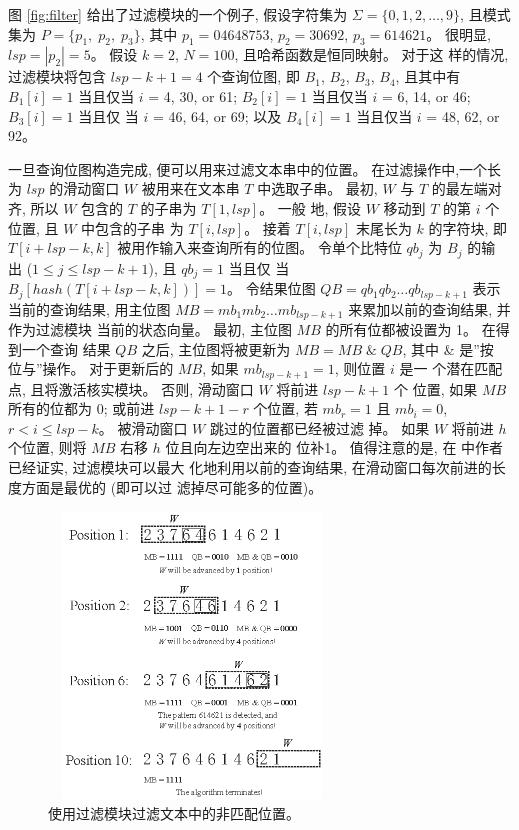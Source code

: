 图 \ref{fig:filter} 给出了过滤模块的一个例子, 假设字符集为
$\Sigma = \{0, 1, 2, \dots, 9\}$, 且模式集为 $P = \{p_1,\; p_2,\;
p_3\}$, 其中 $p_1 = 04648753$, $p_2 = 30692$, $p_3 = 614621$。 很明显,
$lsp = |p_2|= 5$。 假设 $k = 2$, $N = 100$, 且哈希函数是恒同映射。 对于这
样的情况, 过滤模块将包含 $lsp - k + 1 = 4$ 个查询位图, 即 $B_1$,
$B_2$, $B_3$, $B_4$, 且其中有 $B_1[i] = 1$ 当且仅当 $i$ = 4, 30, or
61; $B_2[i] = 1$ 当且仅当 $i$ = 6, 14, or 46; $B_3[i] = 1$ 当且仅
当 $i$ = 46, 64, or 69; 以及 $B_4[i] = 1$ 当且仅当 $i$ = 48, 62, or
92。

一旦查询位图构造完成, 便可以用来过滤文本串中的位置。 在过滤操作中,一个长
为 $lsp$ 的滑动窗口 $W$ 被用来在文本串 $T$ 中选取子串。 最初,
$W$ 与 $T$ 的最左端对齐, 所以 $W$ 包含的 $T$ 的子串为 $T[1,lsp]$。 一般
地, 假设 $W$ 移动到 $T$ 的第 $i$ 个位置, 且 $W$ 中包含的子串
为 $T[i,lsp]$。 接着 $T[i,lsp]$ 末尾长为 $k$ 的字符块, 即 $T[i+lsp-k,
k]$ 被用作输入来查询所有的位图。 令单个比特位 $qb_j$ 为 $B_j$ 的输
出 ($1 \leq j \leq lsp - k + 1$), 且 $qb_j=1$ 当且仅
当 $B_j[hash(T[i+lsp-k,k])] = 1$。 令结果位图
$QB = qb_1qb_2 \dots qb_{lsp-k+1}$ 表示当前的查询结果, 用主位图
$MB = mb_1mb_2 \dots mb_{lsp-k+1}$ 来累加以前的查询结果, 并作为过滤模块
当前的状态向量。 最初, 主位图 $MB$ 的所有位都被设置为 1。 在得到一个查询
结果 $QB$ 之后, 主位图将被更新为 $MB = MB \; \& \; QB$, 其中 \& 是''按
位与''操作。 对于更新后的 $MB$, 如果 $mb_{lsp-k+1} = 1$, 则位置 $i$ 是一
个潜在匹配点, 且将激活核实模块。 否则, 滑动窗口 $W$ 将前进 $lsp-k+1$ 个
位置, 如果 $MB$ 所有的位都为 0; 或前进 $lsp-k+1-r$ 个位置, 若 $mb_r=1$
且 $mb_i=0$, $r < i \leq lsp-k$。 被滑动窗口 $W$ 跳过的位置都已经被过滤
掉。  如果 $W$ 将前进 $h$ 个位置, 则将 $MB$ 右移 $h$ 位且向左边空出来的
位补1。 值得注意的是, 在 \cite{Lee2013} 中作者已经证实, 过滤模块可以最大
化地利用以前的查询结果, 在滑动窗口每次前进的长度方面是最优的 (即可以过
滤掉尽可能多的位置)。

\begin{figure}[H]
  \centering
  \includegraphics[height=3in, width=3in]{figures/2_MPM/filter_match}
  \caption{使用过滤模块过滤文本中的非匹配位置。}
  \label{fig:f_match}
\end{figure}


